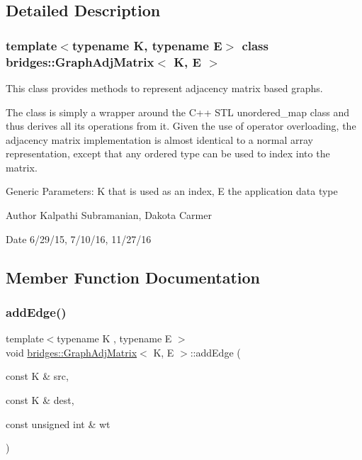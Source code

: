 \subsection{Detailed Description}
\subsubsection*{template$<$typename K, typename E$>$\newline
class bridges\+::\+Graph\+Adj\+Matrix$<$ K, E $>$}

This class provides methods to represent adjacency matrix based graphs. 

The class is simply a wrapper around the C++ S\+TL unordered\+\_\+map class and thus derives all its operations from it. Given the use of operator overloading, the adjacency matrix implementation is almost identical to a normal array representation, except that any ordered type can be used to index into the matrix.

Generic Parameters\+: K that is used as an index, E the application data type

\begin{DoxyAuthor}{Author}
Kalpathi Subramanian, Dakota Carmer 
\end{DoxyAuthor}
\begin{DoxyDate}{Date}
6/29/15, 7/10/16, 11/27/16 
\end{DoxyDate}


\subsection{Member Function Documentation}
\hypertarget{classbridges_1_1_graph_adj_matrix_a98accd921cace9f9d9cff0925aa1e3b2}{}\label{classbridges_1_1_graph_adj_matrix_a98accd921cace9f9d9cff0925aa1e3b2} 
\subsubsection{\texorpdfstring{add\+Edge()}{addEdge()}}
{\footnotesize\ttfamily template$<$typename K , typename E $>$ \\
void \hyperlink{classbridges_1_1_graph_adj_matrix}{bridges\+::\+Graph\+Adj\+Matrix}$<$ K, E $>$\+::add\+Edge (\begin{DoxyParamCaption}\item[{const K \&}]{src,  }\item[{const K \&}]{dest,  }\item[{const unsigned int \&}]{wt }\end{DoxyParamCaption})\hspace{0.3cm}{\ttfamily [inline]}}

